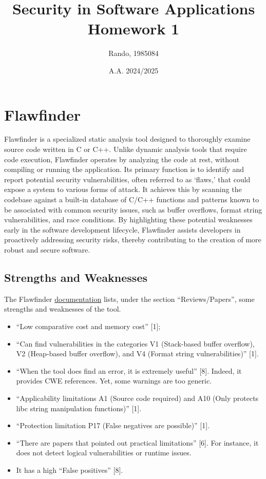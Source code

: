\documentclass[a4paper,10pt]{article}
\title{Security in Software Applications\\Homework 1}
\author{Rando, 1985084}
\date{A.A. 2024/2025}
\begin{document}
\maketitle

\section{Flawfinder}

Flawfinder is a specialized static analysis tool designed to thoroughly examine source code written in C or C++. Unlike dynamic analysis tools that require code execution, Flawfinder operates by analyzing the code at rest, without compiling or running the application. Its primary function is to identify and report potential security vulnerabilities, often referred to as `flaws,' that could expose a system to various forms of attack. It achieves this by scanning the codebase against a built-in database of C/C++ functions and patterns known to be associated with common security issues, such as buffer overflows, format string vulnerabilities, and race conditions. By highlighting these potential weaknesses early in the software development lifecycle, Flawfinder assists developers in proactively addressing security risks, thereby contributing to the creation of more robust and secure software.

\subsection{Strengths and Weaknesses}

The Flawfinder \href{https://dwheeler.com/flawfinder/}{documentation} lists, under the section “Reviews/Papers”, some strengths and weaknesses of the tool.

\begin{itemize}
    \item  ``Low comparative cost and memory cost'' [1];
    \item  ``Can find vulnerabilities in the categories V1 (Stack-based buffer overflow), V2 (Heap-based buffer overflow), and V4 (Format string vulnerabilities)'' [1].
    \item ``When the tool does find an error, it is extremely useful'' [8]. Indeed, it provides CWE references. Yet, some warnings are too generic.
    \item ``Applicability limitations A1 (Source code required) and A10 (Only protects libc string manipulation functions)'' [1].
    \item ``Protection limitation P17 (False negatives are possible)'' [1].
    \item ``There are papers that pointed out practical limitations'' [6]. For instance, it does not detect logical vulnerabilities or runtime issues.
    \item It has a high ``False positives'' [8].
\end{itemize}
\end{document}
